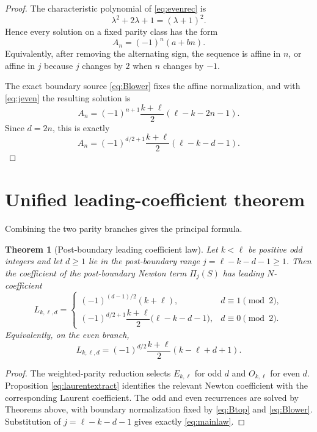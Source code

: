 \documentclass[11pt]{article}
\newtheorem{theorem}{Theorem}[section]
\theoremstyle{remark}
\theoremstyle{definition}
\newcommand{\N}{N}
\newcommand{\Ssym}{S}
\newcommand{\Lkl}{L_{k,\ell,d}}
\newcommand{\Ekl}{E_{k,\ell}}
\newcommand{\Okl}{O_{k,\ell}}
\begin{document}
\begin{proof}
The characteristic polynomial of \eqref{eq:evenrec} is
\[
\lambda^2+2\lambda+1=(\lambda+1)^2.
\]
Hence every solution on a fixed parity class has the form
\begin{equation}
A_n=(-1)^n(a+bn).
\label{eq:even-general}
\end{equation}
Equivalently, after removing the alternating sign, the sequence is affine in
$n$, or affine in $j$ because $j$ changes by $2$ when $n$ changes by $-1$.

The exact boundary source \eqref{eq:Blower} fixes the affine normalization, and
with \eqref{eq:jeven} the resulting solution is
\[
A_n=(-1)^{n+1}\frac{k+\ell}{2}
(\ell-k-2n-1).
\]
Since $d=2n$, this is exactly
\[
A_n=(-1)^{d/2+1}\frac{k+\ell}{2}
(\ell-k-d-1).
\]
\end{proof}

\section{Unified leading-coefficient theorem}

Combining the two parity branches gives the principal formula.

\begin{theorem}[Post-boundary leading coefficient law]
Let $k<\ell$ be positive odd integers and let $d\ge1$ lie in the post-boundary
range $j=\ell-k-d-1\ge1$.  Then the coefficient of the post-boundary Newton
term $\Pi_j(\Ssym)$ has leading $\N$-coefficient
\begin{equation}
\boxed{
\Lkl=
\begin{cases}
(-1)^{(d-1)/2}(k+\ell),
& d\equiv1\pmod 2,\\[6pt]
(-1)^{d/2+1}
\dfrac{k+\ell}{2}\bigl(\ell-k-d-1\bigr),
& d\equiv0\pmod 2.
\end{cases}}
\label{eq:mainlaw}
\end{equation}
Equivalently, on the even branch,
\begin{equation}
\Lkl=
(-1)^{d/2}
\frac{k+\ell}{2}
(k-\ell+d+1).
\end{equation}
\end{theorem}

\begin{proof}
The weighted-parity reduction selects $\Ekl$ for odd $d$ and $\Okl$ for even
$d$.  Proposition \eqref{eq:laurentextract} identifies the relevant Newton
coefficient with the corresponding Laurent coefficient.  The odd and even
recurrences are solved by Theorems above, with boundary normalization fixed
by \eqref{eq:Btop} and \eqref{eq:Blower}.  Substitution of
$j=\ell-k-d-1$ gives exactly \eqref{eq:mainlaw}.
\end{proof}
\end{document}
